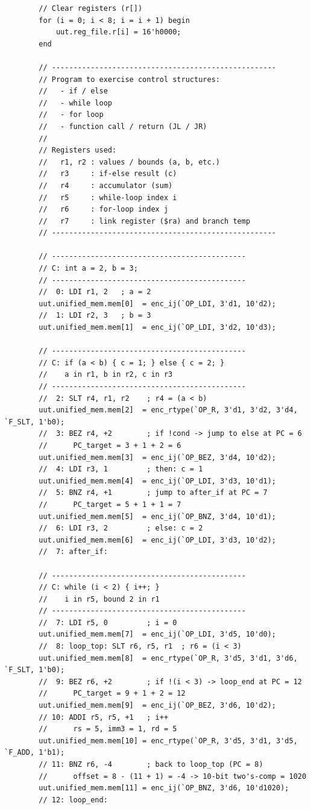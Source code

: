 \documentclass[12pt]{report}
\begin{document}
\begin{lstlisting}
        // Clear registers (r[])
        for (i = 0; i < 8; i = i + 1) begin
            uut.reg_file.r[i] = 16'h0000;
        end

        // ----------------------------------------------------
        // Program to exercise control structures:
        //   - if / else
        //   - while loop
        //   - for loop
        //   - function call / return (JL / JR)
        //
        // Registers used:
        //   r1, r2 : values / bounds (a, b, etc.)
        //   r3     : if-else result (c)
        //   r4     : accumulator (sum)
        //   r5     : while-loop index i
        //   r6     : for-loop index j
        //   r7     : link register ($ra) and branch temp
        // ----------------------------------------------------

        // ---------------------------------------------
        // C: int a = 2, b = 3;
        // ---------------------------------------------
        //  0: LDI r1, 2   ; a = 2
        uut.unified_mem.mem[0]  = enc_ij(`OP_LDI, 3'd1, 10'd2);
        //  1: LDI r2, 3   ; b = 3
        uut.unified_mem.mem[1]  = enc_ij(`OP_LDI, 3'd2, 10'd3);

        // ---------------------------------------------
        // C: if (a < b) { c = 1; } else { c = 2; }
        //    a in r1, b in r2, c in r3
        // ---------------------------------------------
        //  2: SLT r4, r1, r2    ; r4 = (a < b)
        uut.unified_mem.mem[2]  = enc_rtype(`OP_R, 3'd1, 3'd2, 3'd4, `F_SLT, 1'b0);
        //  3: BEZ r4, +2        ; if !cond -> jump to else at PC = 6
        //      PC_target = 3 + 1 + 2 = 6
        uut.unified_mem.mem[3]  = enc_ij(`OP_BEZ, 3'd4, 10'd2);
        //  4: LDI r3, 1         ; then: c = 1
        uut.unified_mem.mem[4]  = enc_ij(`OP_LDI, 3'd3, 10'd1);
        //  5: BNZ r4, +1        ; jump to after_if at PC = 7
        //      PC_target = 5 + 1 + 1 = 7
        uut.unified_mem.mem[5]  = enc_ij(`OP_BNZ, 3'd4, 10'd1);
        //  6: LDI r3, 2         ; else: c = 2
        uut.unified_mem.mem[6]  = enc_ij(`OP_LDI, 3'd3, 10'd2);
        //  7: after_if:

        // ---------------------------------------------
        // C: while (i < 2) { i++; }
        //    i in r5, bound 2 in r1
        // ---------------------------------------------
        //  7: LDI r5, 0         ; i = 0
        uut.unified_mem.mem[7]  = enc_ij(`OP_LDI, 3'd5, 10'd0);
        //  8: loop_top: SLT r6, r5, r1  ; r6 = (i < 3)
        uut.unified_mem.mem[8]  = enc_rtype(`OP_R, 3'd5, 3'd1, 3'd6, `F_SLT, 1'b0);
        //  9: BEZ r6, +2        ; if !(i < 3) -> loop_end at PC = 12
        //      PC_target = 9 + 1 + 2 = 12
        uut.unified_mem.mem[9]  = enc_ij(`OP_BEZ, 3'd6, 10'd2);
        // 10: ADDI r5, r5, +1   ; i++
        //      rs = 5, imm3 = 1, rd = 5
        uut.unified_mem.mem[10] = enc_rtype(`OP_R, 3'd5, 3'd1, 3'd5, `F_ADD, 1'b1);
        // 11: BNZ r6, -4        ; back to loop_top (PC = 8)
        //      offset = 8 - (11 + 1) = -4 -> 10-bit two's-comp = 1020
        uut.unified_mem.mem[11] = enc_ij(`OP_BNZ, 3'd6, 10'd1020);
        // 12: loop_end:


\end{lstlisting}
\end{document}
